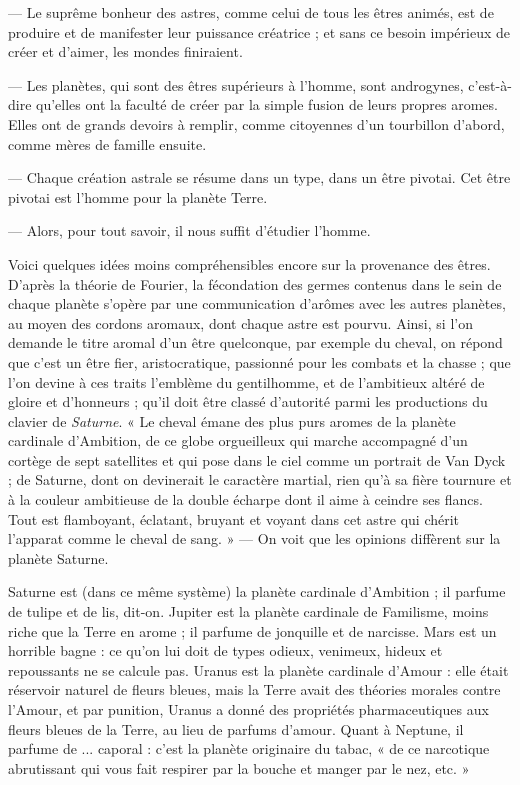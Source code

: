 \documentclass[a4paper, 11pt, oneside, landscape]{article}
\begin{document}
--- Le suprême bonheur des astres, comme celui de tous les êtres animés, est de produire et de manifester leur puissance créatrice ; et sans ce besoin impérieux de créer et d'aimer, les mondes finiraient.

--- Les planètes, qui sont des êtres supérieurs à l'homme, sont androgynes, c'est-à-dire qu'elles ont la faculté de créer par la simple fusion de leurs propres aromes. Elles ont de grands devoirs à remplir, comme citoyennes d'un tourbillon d'abord, comme mères de famille ensuite.

--- Chaque création astrale se résume dans un type, dans un être pivotai. Cet être pivotai est l'homme pour la planète Terre.

--- Alors, pour tout savoir, il nous suffit d'étudier l'homme.

Voici quelques idées moins compréhensibles encore sur la provenance des êtres. D'après la théorie de Fourier, la fécondation des germes contenus dans le sein de chaque planète s'opère par une communication d'arômes avec les autres planètes, au moyen des cordons aromaux, dont chaque astre est pourvu. Ainsi, si l'on demande le titre aromal d'un être quelconque, par exemple du cheval, on répond que c'est un être fier, aristocratique, passionné pour les combats et la chasse ; que l'on devine à ces traits l'emblème du gentilhomme, et de l'ambitieux altéré de gloire et d'honneurs ; qu'il doit être classé d'autorité parmi les productions du clavier de \emph{Saturne}. « Le cheval émane des plus purs aromes de la planète cardinale d'Ambition, de ce globe orgueilleux qui marche accompagné d'un cortège de sept satellites et qui pose dans le ciel comme un portrait de Van Dyck ; de Saturne, dont on devinerait le caractère martial, rien qu'à sa fière tournure et à la couleur ambitieuse de la double écharpe dont il aime à ceindre ses flancs. Tout est flamboyant, éclatant, bruyant et voyant dans cet astre qui chérit l'apparat comme le cheval de sang. » --- On voit que les opinions diffèrent sur la planète Saturne.

Saturne est (dans ce même système) la planète cardinale d'Ambition ; il parfume de tulipe et de lis, dit-on. Jupiter est la planète cardinale de Familisme, moins riche que la Terre en arome ; il parfume de jonquille et de narcisse. Mars est un horrible bagne : ce qu'on lui doit de types odieux, venimeux, hideux et repoussants ne se calcule pas. Uranus est la planète cardinale d'Amour : elle était réservoir naturel de fleurs bleues, mais la Terre avait des théories morales contre l'Amour, et par punition, Uranus a donné des propriétés pharmaceutiques aux fleurs bleues de la Terre, au lieu de parfums d'amour. Quant à Neptune, il parfume de ... caporal : c'est la planète originaire du tabac, « de ce narcotique abrutissant qui vous fait respirer par la bouche et manger par le nez, etc. »
\end{document}
